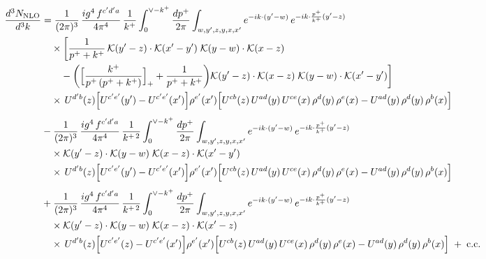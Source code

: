 \documentclass[9pt]{article}
\numberwithin{equation}{section}
\begin{document}
\begin{align}
\frac{d^{3}N_{\rm NLO}}{d^{3}k}&=\frac{1}{(2\pi)^{3}}\,\frac{ig^{4}\,f^{c^{\prime}d^{\prime}a}}{4\pi^{4}}\,\frac{1}{k^{+}}\int_{0}^{\vee-k^{+}}\frac{dp^{+}}{2\pi}\int_{w,y^{\prime},z,y,x,x^{\prime}}e^{-ik\cdot(y^{\prime}-w)}\,e^{-ik\cdot\frac{p^{+}}{k^{+}}(y^{\prime}-z)}\notag\\&\quad\times\bigg[\frac{1}{p^{+}+k^{+}}\,\mathcal{K}(y^{\prime}-z)\cdot\mathcal{K}(x^{\prime}-y^{\prime})\;\mathcal{K}(y-w)\cdot\mathcal{K}(x-z)\notag\\&\qquad-\bigg(\Big[\frac{k^{+}}{p^{+}\,(p^{+}+k^{+})}\Big]_{+}+\frac{1}{p^{+}+k^{+}}\bigg)\mathcal{K}(y^{\prime}-z)\cdot\mathcal{K}(x-z)\;\mathcal{K}(y-w)\cdot\mathcal{K}(x^{\prime}-y^{\prime})\bigg]\notag\\&\quad\times\,U^{d^{\prime}b}(z)\Big[U^{c^{\prime}e^{\prime}}(y^{\prime})-U^{c^{\prime}e^{\prime}}(x^{\prime})\Big]\rho^{e^{\prime}}(x^{\prime})\Big[U^{cb}(z)\,U^{ad}(y)\,U^{ce}(x)\,\rho^{d}(y)\,\rho^{e}(x)-U^{ad}(y)\,\rho^{d}(y)\,\rho^{b}(x)\Big]\notag\\[4pt]&-\frac{1}{(2\pi)^{3}}\,\frac{ig^{4}\,f^{c^{\prime}d^{\prime}a}}{4\pi^{4}}\,\frac{1}{k^{+\,2}}\int_{0}^{\vee-k^{+}}\frac{dp^{+}}{2\pi}\int_{w,y^{\prime},z,y,x,x^{\prime}}e^{-ik\cdot(y^{\prime}-w)}\,e^{-ik\cdot\frac{p^{+}}{k^{+}}(y^{\prime}-z)}\notag\\&\quad\times\mathcal{K}(y^{\prime}-z)\cdot\mathcal{K}(y-w)\;\mathcal{K}(x-z)\cdot\mathcal{K}(x^{\prime}-y^{\prime})\notag\\&\quad\times\,U^{d^{\prime}b}(z)\Big[U^{c^{\prime}e^{\prime}}(y^{\prime})-U^{c^{\prime}e^{\prime}}(x^{\prime})\Big]\rho^{e^{\prime}}(x^{\prime})\Big[U^{cb}(z)\,U^{ad}(y)\,U^{ce}(x)\,\rho^{d}(y)\,\rho^{e}(x)-U^{ad}(y)\,\rho^{d}(y)\,\rho^{b}(x)\Big]\notag\\[4pt]&+\frac{1}{(2\pi)^{3}}\,\frac{ig^{4}\,f^{c^{\prime}d^{\prime}a}}{4\pi^{4}}\,\frac{1}{k^{+\,2}}\int_{0}^{\vee-k^{+}}\frac{dp^{+}}{2\pi}\int_{w,y^{\prime},z,y,x,x^{\prime}}e^{-ik\cdot(y^{\prime}-w)}\,e^{-ik\cdot\frac{p^{+}}{k^{+}}(y^{\prime}-z)}\notag\\&\quad\times\mathcal{K}(y^{\prime}-z)\cdot\mathcal{K}(y-w)\;\mathcal{K}(x-z)\cdot\mathcal{K}(x^{\prime}-z)\notag\\&\quad\times\,U^{d^{\prime}b}(z)\Big[U^{c^{\prime}e^{\prime}}(z)-U^{c^{\prime}e^{\prime}}(x^{\prime})\Big]\rho^{e^{\prime}}(x^{\prime})\Big[U^{cb}(z)\,U^{ad}(y)\,U^{ce}(x)\,\rho^{d}(y)\,\rho^{e}(x)-U^{ad}(y)\,\rho^{d}(y)\,\rho^{b}(x)\Big]\;+\;{\rm c.c.}
\end{align}
\end{document}
